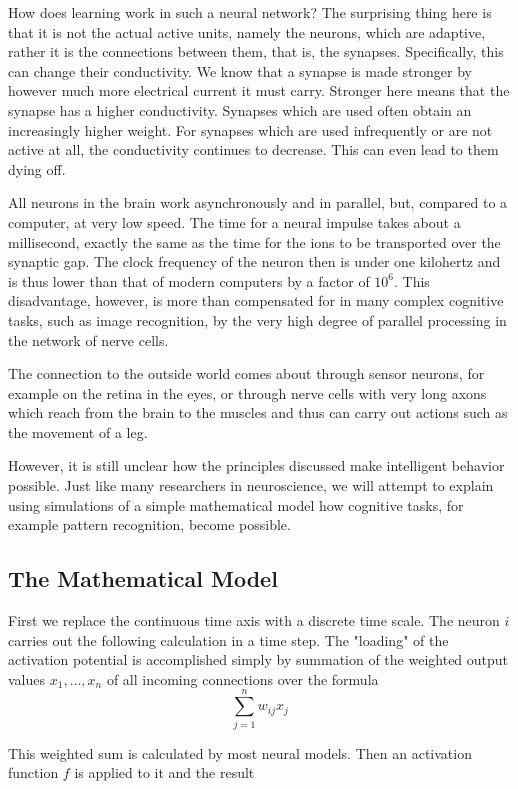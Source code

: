 \documentclass[10pt]{book}
\begin{document}
How does learning work in such a neural network? The surprising thing here is that it is not the actual active units, namely the neurons, which are adaptive, rather it is the connections between them, that is, the synapses. Specifically, this can change their conductivity. We know that a synapse is made stronger by however much more electrical current it must carry. Stronger here means that the synapse has a higher conductivity. Synapses which are used often obtain an increasingly higher weight. For synapses which are used infrequently or are not active at all, the conductivity continues to decrease. This can even lead to them dying off.

All neurons in the brain work asynchronously and in parallel, but, compared to a computer, at very low speed. The time for a neural impulse takes about a millisecond, exactly the same as the time for the ions to be transported over the synaptic gap. The clock frequency of the neuron then is under one kilohertz and is thus lower than that of modern computers by a factor of $10^{6}$. This disadvantage, however, is more than compensated for in many complex cognitive tasks, such as image recognition, by the very high degree of parallel processing in the network of nerve cells.

The connection to the outside world comes about through sensor neurons, for example on the retina in the eyes, or through nerve cells with very long axons which reach from the brain to the muscles and thus can carry out actions such as the movement of a leg.

However, it is still unclear how the principles discussed make intelligent behavior possible. Just like many researchers in neuroscience, we will attempt to explain using simulations of a simple mathematical model how cognitive tasks, for example pattern recognition, become possible.

\subsection{The Mathematical Model}
First we replace the continuous time axis with a discrete time scale. The neuron $i$ carries out the following calculation in a time step. The "loading" of the activation potential is accomplished simply by summation of the weighted output values $x_{1}, \ldots, x_{n}$ of all incoming connections over the formula
$$
\sum_{j=1}^{n} w_{i j} x_{j}
$$

This weighted sum is calculated by most neural models. Then an activation function $f$ is applied to it and the result
\end{document}
